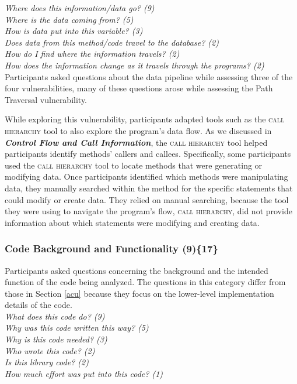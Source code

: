 \documentclass{sig-alternate}
\begin{document}
\noindent\emph{Where does this information/data go? (9)} \\
\emph{Where is the data coming from? (5)} \\
\emph{How is data put into this variable? (3)} \\
\emph{Does data from this method/code travel to the database? (2)} \\
\emph{How do I find where the information travels? (2)} \\
\emph{How does the information change as it travels through the programs? (2)} 
\\

 
Participants asked questions about the data pipeline while assessing three of the four vulnerabilities, many of these questions arose while assessing the Path Traversal vulnerability. 

While exploring this vulnerability, participants adapted tools such as the \textsc{call hierarchy} tool to also explore the program's data flow. 
As we discussed in \emph{\textbf{Control Flow and Call Information}}, the \textsc{call hierarchy} tool helped participants identify methods' callers and callees.
Specifically, some participants used the \textsc{call hierarchy} tool to locate methods that were generating or modifying data.
Once participants identified which methods were manipulating data, they manually searched within the method for the specific statements that could modify or create data.
They relied on manual searching, because the tool they were using to navigate the program's flow, \textsc{call hierarchy}, did not provide information about which statements were modifying and creating data.



\subsubsection{\textbf{Code Background and Functionality (9)\{17\}}}
\label{cbf}
Participants asked questions concerning the background and the intended function of the code being analyzed. 
The questions in this category differ from those in Section \ref{acu} because they focus on the lower-level implementation details of the code.
\\

\noindent\emph{What does this code do? (9)} \\
\emph{Why was this code written this way? (5)} \\
\emph{Why is this code needed? (3)} \\
\emph{Who wrote this code? (2)} \\
\emph{Is this library code? (2)} \\
\emph{How much effort was put into this code? (1)}
\\
\end{document}
